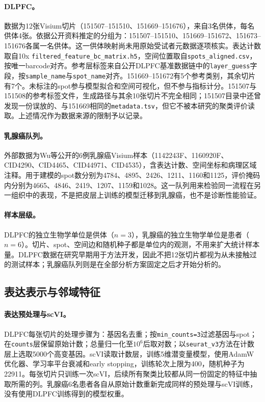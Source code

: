 \paragraph{DLPFC。}数据为12张Visium切片（151507--151510、151669--151676），来自3名供体，每名供体4张。依据公开资料推定的分组为：151507--151510、151669--151672、151673--151676各属一名供体。这一供体映射尚未用原始受试者元数据逐项核实。表达计数取自10x \texttt{filtered\_feature\_bc\_matrix.h5}，空间位置取自\texttt{spots\_aligned.csv}，按唯一barcode对齐。参考层标签来自公开DLPFC基准数据链中的\texttt{layer\_guess}字段\cite{maynard2021}，按\texttt{sample\_name}与\texttt{spot\_name}对齐。151669--151672有5个参考类别，其余切片有7个。未标注的spot参与模型拟合和空间可视化，但不参与指标计分。151507与151508的参考标签文件，生成路径与其余10张切片不完全相同；151507目录中还曾发现一份误放的、与151669相同的\texttt{metadata.tsv}，但它不被本研究的聚类评价读取。上述情况作为数据来源的限制予以记录。

\paragraph{乳腺癌队列。}外部数据为Wu等公开的6例乳腺癌Visium样本（1142243F、1160920F、CID4290、CID4465、CID44971、CID4535）\cite{wu2021,wu2021zenodo}，含表达计数、空间坐标和病理区域注释。用于建模的spot数分别为4784、4895、2426、1211、1160和1125，评价掩码内分别为4665、4846、2419、1207、1159和1028。这一队列用来检验同一流程在另一组织中的表现，不是把皮层上训练的模型迁移到乳腺癌，也不是诊断性能验证。

\paragraph{样本层级。}DLPFC的独立生物学单位是供体（$n=3$），乳腺癌的独立生物学单位是患者（$n=6$）。切片、spot、空间边和随机种子都是单位内的观测，不用来扩大统计样本量。DLPFC数据在研究早期用于方法开发，因此不把12张切片都视为从未接触过的测试样本；乳腺癌队列则是在全部分析方案固定之后才开始分析的。

\subsection{表达表示与邻域特征}
\label{subsec:cc-features-p1}
\paragraph{表达预处理与scVI。}DLPFC每张切片的处理步骤为：基因名去重；按\texttt{min\_counts=3}过滤基因与spot；在\texttt{counts}层保留原始计数；总量归一化至$10^6$后取对数；以\texttt{seurat\_v3}方法在计数层上选取5000个高变基因。scVI读取计数层，训练5维潜变量模型\cite{lopez2018}，使用AdamW优化器、学习率平台衰减和early stopping，训练轮次上限为400，随机种子为22911。每张切片只训练一次scVI，后续所有聚类比较都从同一份固定的特征中抽取所需的列。乳腺癌6名患者各自从原始计数重新完成同样的预处理与scVI训练，没有使用DLPFC训练得到的模型权重。

